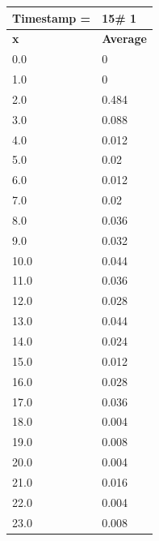 \begin{tabular}{|l||l|}
\hline
\textbf{Timestamp =} & \textbf{15}\# 1\\\hline
	\textbf{x} & \textbf{Average} \\ \hline
\hline
	0.0 & 0 \\ \hline
	1.0 & 0 \\ \hline
	2.0 & 0.484 \\ \hline
	3.0 & 0.088 \\ \hline
	4.0 & 0.012 \\ \hline
	5.0 & 0.02 \\ \hline
	6.0 & 0.012 \\ \hline
	7.0 & 0.02 \\ \hline
	8.0 & 0.036 \\ \hline
	9.0 & 0.032 \\ \hline
	10.0 & 0.044 \\ \hline
	11.0 & 0.036 \\ \hline
	12.0 & 0.028 \\ \hline
	13.0 & 0.044 \\ \hline
	14.0 & 0.024 \\ \hline
	15.0 & 0.012 \\ \hline
	16.0 & 0.028 \\ \hline
	17.0 & 0.036 \\ \hline
	18.0 & 0.004 \\ \hline
	19.0 & 0.008 \\ \hline
	20.0 & 0.004 \\ \hline
	21.0 & 0.016 \\ \hline
	22.0 & 0.004 \\ \hline
	23.0 & 0.008 \\ \hline
\end{tabular}

